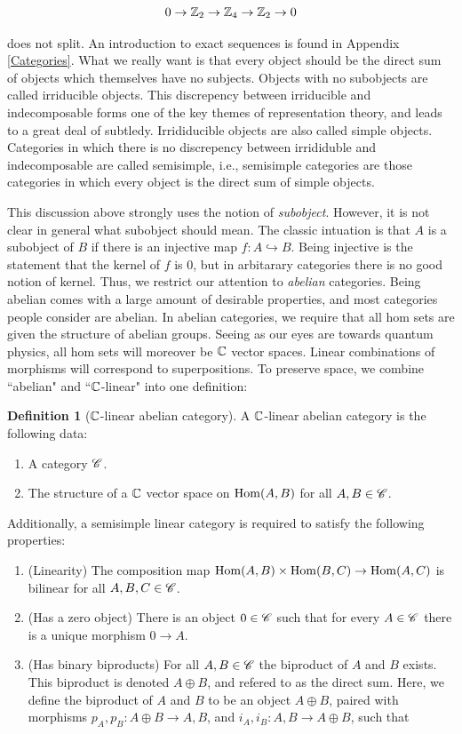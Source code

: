 \documentclass{article}
\theoremstyle{definition}
\newtheorem*{definition}{Definition}
\numberwithin{figure}{section}
\begin{document}
\begin{enumerate}[\thesection .1.]
$$0\to \mathbb{Z}_2\to \mathbb{Z}_4\to\mathbb{Z}_2\to 0$$

does not split. An introduction to exact sequences is found in Appendix \ref{Categories}. What we really want is that every object should be the direct sum of objects which themselves have no subjects. Objects with no subobjects are called irriducible objects. This discrepency between irriducible and indecomposable forms one of the key themes of representation theory, and leads to a great deal of subtledy. Irrididucible objects are also called simple objects. Categories in which there is no discrepency between irrididuble and indecomposable are called semisimple, i.e., semisimple categories are those categories in which every object is the direct sum of simple objects.

This discussion above strongly uses the notion of \textit{subobject}. However, it is not clear in general what subobject should mean. The classic intuation is that $A$ is a subobject of $B$ if there is an injective map $f:A\hookrightarrow{}B$. Being injective is the statement that the kernel of $f$ is  $0$, but in arbitarary categories there is no good notion of kernel. Thus, we restrict our attention to \textit{abelian} categories. Being abelian comes with a large amount of desirable properties, and most categories people consider are abelian. In abelian categories, we require that all hom sets are given the structure of abelian groups. Seeing as our eyes are towards quantum physics, all hom sets will moreover be $\mathbb{C}$ vector spaces. Linear combinations of morphisms will correspond to superpositions. To preserve space, we combine ``abelian" and ``$\mathbb{C}$-linear" into one definition:

\begin{definition}[$\mathbb{C}$-linear abelian category]  A $\mathbb{C}$-linear abelian category is the following data:

\begin{enumerate}
\item A category $\mathscr{C}$.
\item The structure of a $\mathbb{C}$ vector space on $\mathrm{Hom}(A,B)$ for all $A,B\in \mathscr{C}$.
\end{enumerate}

Additionally, a semisimple linear category is required to satisfy the following properties:

\begin{enumerate}
\item (Linearity) The composition map $\mathrm{Hom}(A,B)\times \mathrm{Hom}(B,C)\to \mathrm{Hom}(A,C)$ is bilinear for all $A,B,C\in \mathscr{C}$.
\item (Has a zero object) There is an object $0\in \mathscr{C}$ such that for every $A\in \mathscr{C}$ there is a unique morphism $0\to A$.
\item (Has binary biproducts) For all $A,B\in \mathscr{C}$ the biproduct of $A$ and $B$ exists. This biproduct is denoted $A\oplus B$, and refered to as the direct sum. Here, we define the biproduct of $A$ and $B$ to be an object $A\oplus B$, paired with morphisms $p_{A},p_{B}: A\oplus B\to A,B$, and  $i_{A},i_{B}: A,B\to A\oplus B$, such that


\end{enumerate}
\end{definition}
\end{enumerate}
\end{document}
